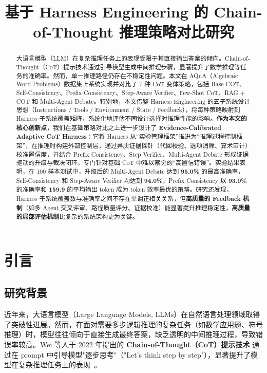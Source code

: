 \documentclass[lang=cn,a4paper,newtx]{elegantpaper}
\title{基于 Harness Engineering 的 Chain-of-Thought 推理策略对比研究}
\institute{项目地址：\href{https://github.com/SHenpengYU01/nlp-cot}{https://github.com/SHenpengYU01/nlp-cot}}
\date{\zhdate{2026/6/28}}
\begin{document}
\maketitle

\begin{abstract}
大语言模型（LLM）在复杂推理任务上的表现受限于其直接输出答案的倾向。Chain-of-Thought（CoT）提示技术通过引导模型生成中间推理步骤，显著提升了数学推理等任务的准确率。然而，单一推理路径仍存在不稳定性问题。本文在 AQuA（Algebraic Word Problems）数据集上系统实现并对比了 7 种 CoT 变体策略，包括 Base COT、Self-Consistency、Prefix Consistency、Step-Aware Verifier、Few-Shot CoT、RAG + COT 和 Multi-Agent Debate。特别地，本文借鉴 Harness Engineering 的五子系统设计思想（Instructions / Tools / Environment / State / Feedback），将每种策略映射到 Harness 子系统覆盖矩阵，系统化地评估不同设计选择对推理性能的影响。\textbf{作为本文的核心创新点}，我们在基础策略对比之上进一步设计了 \textbf{Evidence-Calibrated Adaptive CoT Harness}：它将 Harness 从“实验管理框架”推进为“推理过程控制框架”，在推理时构建外部控制层，通过异质证据探针（代回校验、选项消除、算术审计）校准置信度，并结合 Prefix Consistency、Step Verifier、Multi-Agent Debate 形成证据驱动的升级与裁决闭环，专门针对基础 CoT 中难以察觉的“高置信错误”。实验结果表明，在 100 样本测试中，升级后的 Multi-Agent Debate 达到 \textbf{95.0\%} 的最高准确率，Self-Consistency 和 Step-Aware Verifier 均达到 \textbf{94.0\%}，Prefix Consistency 以 \textbf{93.0\%} 的准确率和 \textbf{159.9} 的平均输出 token 成为 token 效率最优的策略。研究还发现，Harness 子系统覆盖数与准确率之间不存在单调正相关关系，但\textbf{高质量的 Feedback 机制}（如多 Agent 交叉评审、路径质量评分、证据校准）能显著提升推理稳定性，\textbf{高质量的局部评估机制}比复杂的系统架构更为关键。
\end{abstract}

\section{引言}

\subsection{研究背景}

近年来，大语言模型（Large Language Models, LLMs）在自然语言处理领域取得了突破性进展。然而，在面对需要多步逻辑推理的复杂任务（如数学应用题、符号推理）时，模型往往倾向于直接生成最终答案，缺乏透明的中间推理过程，导致错误率较高。Wei 等人于 2022 年提出的 \textbf{Chain-of-Thought（CoT）提示技术} 通过在 prompt 中引导模型"逐步思考"（"Let's think step by step"），显著提升了模型在复杂推理任务上的表现~\cite{wei2022cot}。
\end{document}

